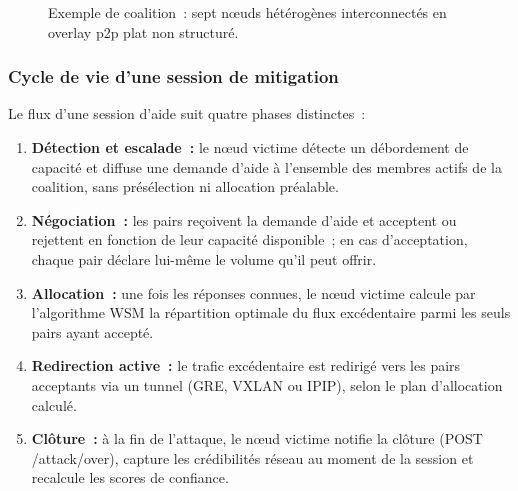 \begin{figure}[H]
\centering
{}
\caption{Exemple de coalition~: sept nœuds hétérogènes interconnectés en overlay \gls{p2p} plat non structuré.}
\label{fig:coalition}
\end{figure}

\subsubsection{Cycle de vie d'une session de mitigation}
\label{subsec:cycle_vie}

Le flux d'une session d'aide suit quatre phases distinctes~:

\begin{enumerate}
    \item \textbf{Détection et escalade~:} le nœud victime détecte un débordement de capacité et diffuse une demande d'aide à l'ensemble des membres actifs de la coalition, sans présélection ni allocation préalable.
    \item \textbf{Négociation~:} les pairs reçoivent la demande d'aide et acceptent ou rejettent en fonction de leur capacité disponible~; en cas d'acceptation, chaque pair déclare lui-même le volume qu'il peut offrir.
    \item \textbf{Allocation~:} une fois les réponses connues, le nœud victime calcule par l'algorithme WSM la répartition optimale du flux excédentaire parmi les seuls pairs ayant accepté.
    \item \textbf{Redirection active~:} le trafic excédentaire est redirigé vers les pairs acceptants via un tunnel (GRE, VXLAN ou IPIP), selon le plan d'allocation calculé.
    \item \textbf{Clôture~:} à la fin de l'attaque, le nœud victime notifie la clôture ({POST /attack/over}), capture les crédibilités réseau au moment de la session et recalcule les scores de confiance.
\end{enumerate}

